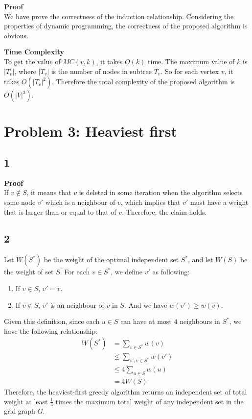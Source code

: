 \documentclass{article}
\newcommand{\Complexity}{\vspace{0.3cm} \noindent\textbf{Time Complexity} \\}
\newcommand{\Proof}{\vspace{0.3cm} \noindent\textbf{Proof} \\}
\begin{document}
\Proof
We have prove the correctness of the induction relationship. Considering the properties of dynamic
programming, the correctness of the proposed algorithm is obvious.

\Complexity
To get the value of $MC(v, k)$, it takes $O(k)$ time. The maximum value of $k$ is $|T_v|$, where
$|T_v|$ is the number of nodes in subtree $T_v$. So for each vertex $v$, it takes $O(|T_v|^2)$.
Therefore the total complexity of the proposed algorithm is $O(|V|^3)$.

\section*{Problem 3: Heaviest first}
\subsection*{1}
\Proof
If $v\not\in S$, it means that $v$ is deleted in some iteration when the algorithm selects some node
$v'$ which is a neighbour of $v$, which implies that $v'$ must have a weight that is larger than or
equal to that of $v$. Therefore, the claim holds.

\subsection*{2}
Let $W(S^*)$ be the weight of the optimal independent set $S^*$, and let $W(S)$ be the weight of set
$S$. For each $v \in S^*$, we define $v'$ as following:
\begin{enumerate}
  \item If $v \in S$, $v'= v$.
  \item If $v \not\in S$, $v'$ is an neighbour of $v$ in $S$. And we have $w(v') \geq w(v)$. 
\end{enumerate}

Given this definition, since each $u \in S$ can have at most $4$ neighbours in $S^*$, we have the following relationship:
\begin{align}
  W(S^*) & = \sum_{v \in S^*} w(v) \\ 
  & \leq \sum_{v', v \in S^*} w(v')  \\
  & \leq 4 \sum_{u \in S} w(u) \\
  & = 4W(S)
\end{align}
Therefore, the heaviest-first greedy algorithm returns an independent set of total weight at least 
$\frac{1}{4}$ times the maximum total weight of any independent set in the grid graph $G$.
\end{document}
